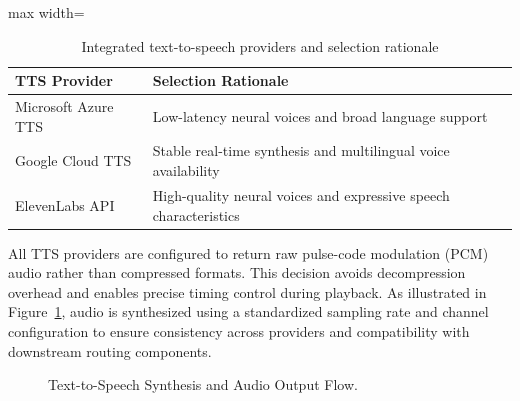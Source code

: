 \begin{table}[!htbp]
  \centering
  \caption[Integrated TTS providers and selection rationale]{Integrated text-to-speech providers and selection rationale}
  \label{tab:tts_providers}
  \begin{adjustbox}{max width=\textwidth}
    \begin{tabular}{p{4.5cm} p{11.8cm}}
      \toprule
      \textbf{TTS Provider} & \textbf{Selection Rationale} \\
      \midrule
      Microsoft Azure TTS\footnotemark & Low-latency neural voices and broad language support \\
      \midrule
      Google Cloud TTS\footnotemark & Stable real-time synthesis and multilingual voice availability \\
      \midrule
      ElevenLabs API\footnotemark & High-quality neural voices and expressive speech characteristics \\
      \bottomrule
    \end{tabular}
  \end{adjustbox}
\end{table}

\addtocounter{footnote}{-2} %



All TTS providers are configured to return raw pulse-code modulation (PCM) audio rather than compressed formats. This decision avoids decompression overhead and enables precise timing control during playback. As illustrated in Figure~\ref{fig:tts_flow}, audio is synthesized using a standardized sampling rate and channel configuration to ensure consistency across providers and compatibility with downstream routing components.

\begin{figure}[!htbp]
  \centering
  
  \caption[TTS Synthesis and Audio Output Flow]{Text-to-Speech Synthesis and Audio Output Flow.}
  \label{fig:tts_flow}
\end{figure}

